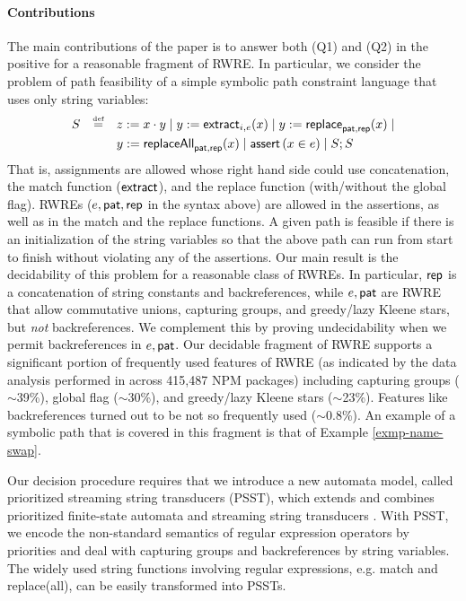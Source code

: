 \paragraph*{Contributions}
The main contributions of the paper is to answer both (Q1) and (Q2) in the
positive for a reasonable fragment of RWRE. In particular, we consider the 
problem of path feasibility of a simple symbolic path constraint language
that uses only string variables:
\[
\begin{array}{l c l}
\smallskip
S & \eqdef  & z:= x \concat y \mid y := \extract_{i, e}(x) \mid  
y := \replace_{\pat, \rep}(x) \mid \\
& & y := \replaceall_{\pat, \rep}(x)   \mid 
 \ASSERT{x \in e} \mid S; S\
\label{eq:SL}
\end{array}
\]
That is, assignments are allowed whose right hand side could use concatenation,
the match function ($\mathsf{extract}$), and the replace function (with/without the 
global flag). RWREs ($e,\mathsf{pat},\mathsf{rep}$ in the syntax above) are allowed in the 
assertions, as well as in the match and the replace functions. A given path is
feasible if there is an initialization of the string variables so that the above
path can run from start to finish without violating any of the assertions.
Our main result is the decidability of this problem for a reasonable class of
RWREs. In particular, $\mathsf{rep}$ is a concatenation of string 
constants and backreferences, while $e, \mathsf{pat}$ are RWRE that allow commutative
unions, capturing groups, and greedy/lazy Kleene stars, but \emph{not} 
backreferences. We complement this by proving undecidability when we permit
backreferences in $e, \mathsf{pat}$.
Our decidable fragment of RWRE supports a significant portion of
frequently used features of RWRE (as indicated by the data analysis performed in
\cite{LMK19} across 415,487 NPM packages) including capturing groups ($\sim$39\%), 
global flag ($\sim$30\%), and greedy/lazy Kleene stars ($\sim$23\%). Features
like backreferences turned out to be not so frequently used ($\sim$0.8\%).
An example of a symbolic path that is covered in this fragment is that of
Example \ref{exmp-name-swap}.

Our decision procedure requires that we introduce a new automata model, called 
prioritized streaming string transducers (PSST), which extends and combines 
prioritized finite-state automata \cite{BM17} and streaming string transducers 
\cite{AC10,AD11}. With PSST, we encode the non-standard semantics of regular 
expression operators by priorities and deal with capturing groups and backreferences by string variables. 
The widely used string functions involving regular expressions, e.g. match and replace(all), can be easily transformed into PSSTs. 

